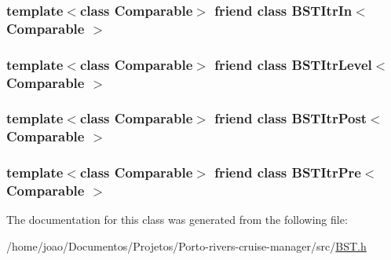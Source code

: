 \subsubsection[{\texorpdfstring{B\+S\+T\+Itr\+In$<$ Comparable $>$}{BSTItrIn< Comparable >}}]{\setlength{\rightskip}{0pt plus 5cm}template$<$class Comparable$>$ friend class {\bf B\+S\+T\+Itr\+In}$<$ Comparable $>$\hspace{0.3cm}{\ttfamily [friend]}}\hypertarget{classBinaryNode_aab3993acac2ab24a0b59edb0c3acc775}{}\label{classBinaryNode_aab3993acac2ab24a0b59edb0c3acc775}
\subsubsection[{\texorpdfstring{B\+S\+T\+Itr\+Level$<$ Comparable $>$}{BSTItrLevel< Comparable >}}]{\setlength{\rightskip}{0pt plus 5cm}template$<$class Comparable$>$ friend class {\bf B\+S\+T\+Itr\+Level}$<$ Comparable $>$\hspace{0.3cm}{\ttfamily [friend]}}\hypertarget{classBinaryNode_a26ff00bc0d87069aed877f10fd3c80a8}{}\label{classBinaryNode_a26ff00bc0d87069aed877f10fd3c80a8}
\subsubsection[{\texorpdfstring{B\+S\+T\+Itr\+Post$<$ Comparable $>$}{BSTItrPost< Comparable >}}]{\setlength{\rightskip}{0pt plus 5cm}template$<$class Comparable$>$ friend class {\bf B\+S\+T\+Itr\+Post}$<$ Comparable $>$\hspace{0.3cm}{\ttfamily [friend]}}\hypertarget{classBinaryNode_a5dc153694be266f6e772659486219da7}{}\label{classBinaryNode_a5dc153694be266f6e772659486219da7}
\subsubsection[{\texorpdfstring{B\+S\+T\+Itr\+Pre$<$ Comparable $>$}{BSTItrPre< Comparable >}}]{\setlength{\rightskip}{0pt plus 5cm}template$<$class Comparable$>$ friend class {\bf B\+S\+T\+Itr\+Pre}$<$ Comparable $>$\hspace{0.3cm}{\ttfamily [friend]}}\hypertarget{classBinaryNode_a45a55df6f11541416d4ea7684c575c1a}{}\label{classBinaryNode_a45a55df6f11541416d4ea7684c575c1a}


The documentation for this class was generated from the following file\+:\begin{DoxyCompactItemize}
\item 
/home/joao/\+Documentos/\+Projetos/\+Porto-\/rivers-\/cruise-\/manager/src/\hyperlink{BST_8h}{B\+S\+T.\+h}\end{DoxyCompactItemize}

